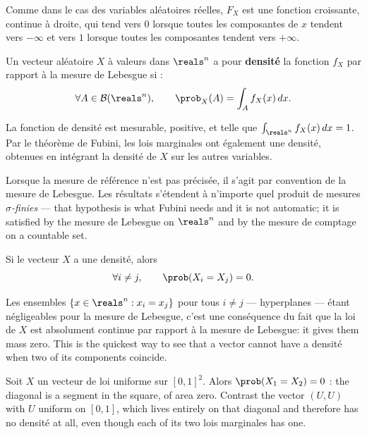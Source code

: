 Comme dans le cas des variables aléatoires réelles, $F_{X}$ est une fonction
croissante, continue à droite, qui tend vers $0$ lorsque toutes les composantes de
$x$ tendent vers $-\infty$ et vers $1$ lorsque toutes les composantes tendent vers
$+\infty$.

\begin{definition}
  Un vecteur aléatoire $X$ à valeurs dans $\reals^{n}$ a pour \textbf{densité} la
  fonction $f_{X}$ par rapport à la mesure de Lebesgue si :
  \[
    \forall A \in \mathcal{B}(\reals^{n}), \qquad
    \prob_{X}(A) = \int_{A} f_{X}(x)\,dx .
  \]
\end{definition}

La fonction de densité est mesurable, positive, et telle que
$\int_{\reals^{n}} f_{X}(x)\,dx = 1$. Par le théorème de Fubini, les lois
marginales ont également une densité, obtenues en intégrant la densité de $X$ sur
les autres variables.

\begin{remark}
  Lorsque la mesure de référence n'est pas précisée, il s'agit par convention de
  la mesure de Lebesgue. Les résultats s'étendent à n'importe quel produit de
  mesures \emph{$\sigma$-finies} --- that hypothesis is what Fubini needs and it
  is not automatic; it is satisfied by the mesure de Lebesgue on $\reals^{n}$ and
  by the mesure de comptage on a countable set.
\end{remark}

\begin{prop}
  Si le vecteur $X$ a une densité, alors
  \[
    \forall i \neq j, \qquad \prob(X_{i}=X_{j}) = 0.
  \]
\end{prop}

\begin{remark}
  Les ensembles $\{x \in \reals^{n} : x_{i}=x_{j}\}$ pour tous $i \neq j$ ---
  hyperplanes --- étant négligeables pour la mesure de Lebesgue, c'est une
  conséquence du fait que la loi de $X$ est absolument continue par rapport à la
  mesure de Lebesgue: it gives them mass zero. This is the quickest way to see
  that a vector cannot have a densité when two of its components coincide.
\end{remark}

\begin{example}
  Soit $X$ un vecteur de loi uniforme sur $[0,1]^{2}$. Alors
  $\prob(X_{1}=X_{2})=0$ : the diagonal is a segment in the square, of area zero.
  Contrast the vector $(U,U)$ with $U$ uniform on $[0,1]$, which lives entirely on
  that diagonal and therefore has no densité at all, even though each of its two
  lois marginales has one.
\end{example}

